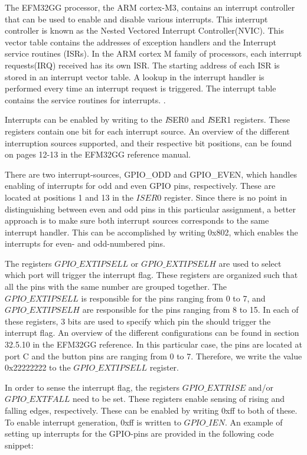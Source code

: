 The EFM32GG processor, the ARM cortex-M3, contains an interrupt controller that can be used to enable and disable various interrupts. This interrupt controller is known as the Nested Vectored Interrupt Controller(NVIC). This vector table contains the addresses of exception handlers and the Interrupt service routines (ISRs). In the ARM cortex M family of processors, each interrupt requests(IRQ) received has its own ISR. The starting address of each ISR is stored in an interrupt vector table. A lookup in the interrupt handler is performed every time an interrupt request is triggered. The interrupt table contains the service routines for interrupts. \cite{EFM32-int}. 

Interrupts can be enabled by writing to the \emph ISER0 and \emph ISER1 registers. These registers contain one bit for each interrupt source. An overview of the different interruption sources supported, and their respective bit positions, can be found on pages 12-13 in the EFM32GG reference manual. 

There are two interrupt-sources, GPIO\_ODD and GPIO\_EVEN, which handles enabling of interrupts for odd and even GPIO pins, respectively. These are located at positions 1 and 13 in the $ISER0$ register. Since there is no point in distinguishing between even and odd pins in this particular assignment, a better approach is to make sure both interrupt sources corresponds to the same interrupt handler. This can be accomplished by writing 0x802, which enables the interrupts for even- and odd-numbered pins.

The registers $GPIO\_EXTIPSELL$ or $GPIO\_EXTIPSELH$ are used to select which port will trigger the interrupt flag. These registers are organized such that all the pins with the same number are grouped together. The $GPIO\_EXTIPSELL$ is responsible for the pins ranging from 0 to 7, and $GPIO\_EXTIPSELH$ are responsible for the pins ranging from 8 to 15. In each of these registers, 3 bits are used to specify which pin the should trigger the interrupt flag. An overview of the different configurations can be found in section 32.5.10 in the EFM32GG reference\cite{EFM32GG-rm}. In this particular case, the pins are located at port C and the button pins are ranging from 0 to 7. Therefore, we write the value 0x22222222 to the $GPIO\_EXTIPSELL$ register.

In order to sense the interrupt flag, the registers $GPIO\_EXTRISE$ and/or $GPIO\_EXTFALL$ need to be set. These registers enable sensing of rising and falling edges, respectively. These can be enabled by writing 0xff to both of these. To enable interrupt generation, 0xff is written to $GPIO\_IEN$. An example of setting up interrupts for the GPIO-pins are provided in the following code snippet: 

